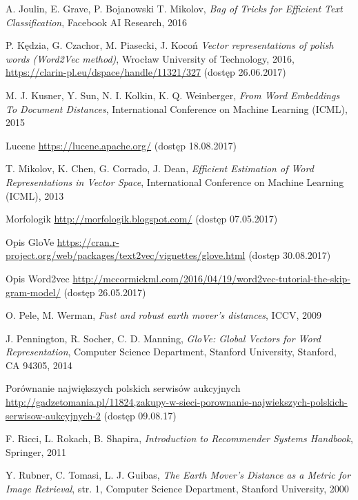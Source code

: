 \documentclass[pl]{minipw} %
\begin{document}
\begin{thebibliography}{30}
		A. Joulin, E. Grave, P. Bojanowski T. Mikolov,
		\emph{Bag of Tricks for Efficient Text Classification},
		Facebook AI Research,
		2016
	
		P. Kędzia, G. Czachor, M. Piasecki, J. Kocoń
		\emph{Vector representations of polish words (Word2Vec method)},
		Wrocław University of Technology,
		2016,
		\url{https://clarin-pl.eu/dspace/handle/11321/327}
		(dostęp 26.06.2017)
	
		M. J. Kusner, Y. Sun, N. I. Kolkin, K. Q. Weinberger,
		\emph{From Word Embeddings To Document Distances},
		International Conference on Machine Learning (ICML),
		2015
	
		Lucene
		\url{https://lucene.apache.org/}
		(dostęp 18.08.2017)
	
		T. Mikolov, K. Chen, G. Corrado, J. Dean,
		\emph{Efficient Estimation of Word Representations in Vector Space},
		International Conference on Machine Learning (ICML),
		2013
	
		Morfologik
		\url{http://morfologik.blogspot.com/}
		(dostęp 07.05.2017)
	
		Opis GloVe
		\url{https://cran.r-project.org/web/packages/text2vec/vignettes/glove.html}
		(dostęp 30.08.2017)
	
		Opis Word2vec
		\url{http://mccormickml.com/2016/04/19/word2vec-tutorial-the-skip-gram-model/}
		(dostęp 26.05.2017)
	
		O. Pele, M. Werman,
		\emph{Fast and robust earth mover's distances},
		ICCV,
		2009
	
		J. Pennington, R. Socher, C. D. Manning,
		\emph{GloVe: Global Vectors for Word Representation},
		Computer Science Department, Stanford University, Stanford, CA 94305,
		2014
	
		Porównanie największych polskich serwisów aukcyjnych
		\url{http://gadzetomania.pl/11824,zakupy-w-sieci-porownanie-najwiekszych-polskich-serwisow-aukcyjnych-2}
		(dostęp 09.08.17)
	
		F. Ricci, L. Rokach, B. Shapira,
		\emph{Introduction to Recommender Systems Handbook},
		Springer,
		2011
	
		Y. Rubner, C. Tomasi, L. J. Guibas,
		\emph{The Earth Mover's Distance as a Metric for Image Retrieval},
		str. 1,
		Computer Science Department, Stanford University,
		2000	


\end{thebibliography}
\end{document}
